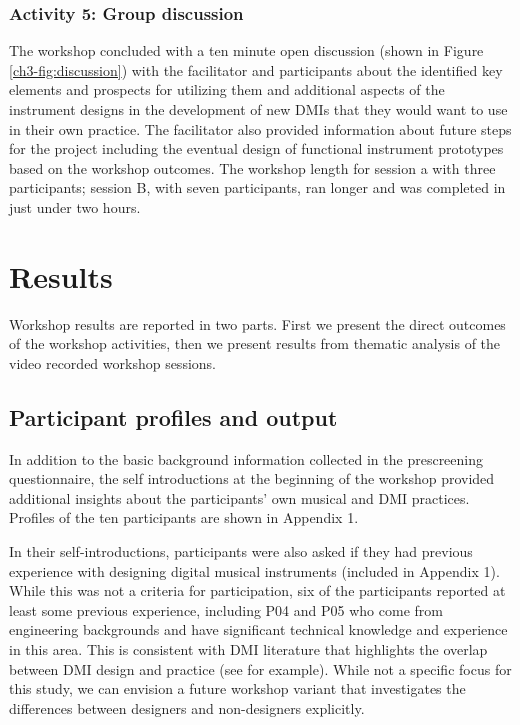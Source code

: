 \documentclass[letterpaper, 12pt]{article}
\begin{document}
\subsubsection{Activity 5: Group discussion}
\label{ch3-sec:activity-5-group-discussion}

The workshop concluded with a ten minute open discussion (shown in Figure \ref{ch3-fig:discussion}) with the facilitator and participants about the identified key elements and prospects for utilizing them and additional aspects of the instrument designs in the development of new DMIs that they would want to use in their own practice. The facilitator also provided information about future steps for the project including the eventual design of functional instrument prototypes based on the workshop outcomes. The workshop length for session a with three participants; session B, with seven participants, ran longer and was completed in just under two hours. 

\section{Results}
\label{ch3-sec:results}

Workshop results are reported in two parts. First we present the direct outcomes of the workshop activities, then we present results from thematic analysis of the video recorded workshop sessions. 

\subsection{Participant profiles and output}
\label{ch3-sec:participant-profiles-and-output}

In addition to the basic background information collected in the prescreening questionnaire, the self introductions at the beginning of the workshop provided additional insights about the participants' own musical and DMI practices. Profiles of the ten participants are shown in Appendix 1.

In their self-introductions, participants were also asked if they had previous experience with designing digital musical instruments (included in Appendix 1). While this was not a criteria for participation, six of the participants reported at least some previous experience, including P04 and P05 who come from engineering backgrounds and have significant technical knowledge and experience in this area. This is consistent with DMI literature that highlights the overlap between DMI design and practice (see \citet{Magnusson2008, Morreale2017, Morreale2018} for example). While not a specific focus for this study, we can envision a future workshop variant that investigates the differences between designers and non-designers explicitly.
\end{document}
